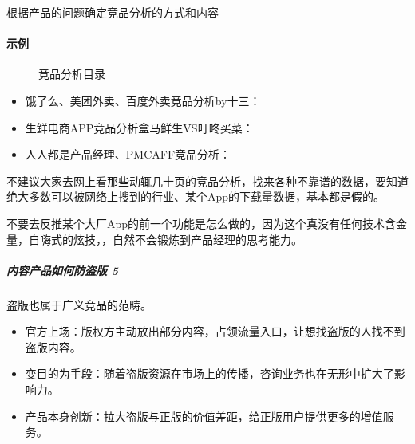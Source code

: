 \documentclass[letterpaper,10pt,english]{sphinxmanual}
\begin{document}
根据产品的问题确定竞品分析的方式和内容


\paragraph{示例}
\label{\detokenize{chapter_knowledge/goods_analysis:id29}}
\begin{figure}[H]
\centering
\capstart

\noindent{}
\caption{竞品分析目录\sphinxfootnotemark[532]}\label{\detokenize{chapter_knowledge/goods_analysis:id34}}\end{figure}
%
\begin{footnotetext}[532]\sphinxAtStartFootnote
{}
%
\end{footnotetext}\ignorespaces \begin{itemize}
\item {} 
饿了么、美团外卖、百度外卖竞品分析by十三：

\item {} 
生鲜电商APP竞品分析\sphinxhyphen{}盒马鲜生VS叮咚买菜：

\item {} 
人人都是产品经理、PMCAFF竞品分析：

\end{itemize}

不建议大家去网上看那些动辄几十页的竞品分析，找来各种不靠谱的数据，要知道绝大多数可以被网络上搜到的行业、某个App的下载量数据，基本都是假的。

不要去反推某个大厂App的前一个功能是怎么做的，因为这个真没有任何技术含金量，自嗨式的炫技，，自然不会锻炼到产品经理的思考能力。%
\begin{footnote}[533]\sphinxAtStartFootnote
{}
%
\end{footnote}


\subparagraph{内容产品如何防盗版 5\sphinxfootnotemark[534]}
\label{\detokenize{chapter_knowledge/goods_analysis:id30}}%
\begin{footnotetext}[534]\sphinxAtStartFootnote
{}
%
\end{footnotetext}\ignorespaces 
盗版也属于广义竞品的范畴。
\begin{itemize}
\item {} 
官方上场：版权方主动放出部分内容，占领流量入口，让想找盗版的人找不到盗版内容。

\item {} 
变目的为手段：随着盗版资源在市场上的传播，咨询业务也在无形中扩大了影响力。

\item {} 
产品本身创新：拉大盗版与正版的价值差距，给正版用户提供更多的增值服务。

\end{itemize}
\end{document}
